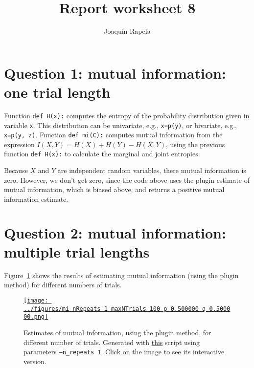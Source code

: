 \documentclass[12pt]{article}
\title{Report worksheet 8}
\author{Joaqu\'{i}n Rapela}
\begin{document}
\maketitle

\section*{Question 1: mutual information: one trial length}

Function \texttt{def H(x):} computes the entropy of the probability
distribution given in variable \texttt{x}. This distribution can be univariate,
e.g., \texttt{x=p(y)}, or bivariate, e.g., \texttt{x=p(y, z)}. Function
\texttt{def mi(C):} computes mutual information from the expression $I(X,
Y)=H(X)+H(Y)-H(X,Y)$, using the previous function \texttt{def H(x):} to
calculate the marginal and joint entropies.

Because $X$ and $Y$ are independent random variables, there mutual information
is zero. However, we don't get zero, since the code above uses the plugin
estimate of mutual information, which is biased above, and returns a positive
mutual information estimate.

\section*{Question 2: mutual information: multiple trial lengths}

Figure~\ref{fig:miEstimatesMultiTrial} shows the results of estimating mutual
information (using the plugin method) for different numbers of trials.

\begin{figure}[H]
    \begin{center}
        \href{https://www.gatsby.ucl.ac.uk/~rapela/neuroinformatics/2023/ws8/figures/mi_nRepeats_1_maxNTrials_100_p_0.500000_q_0.500000.html}{\texttt{[image: ../figures/mi\_nRepeats\_1\_maxNTrials\_100\_p\_0.500000\_q\_0.500000.png]}}

        \caption{Estimates of mutual information, using the plugin method, for different number of trials.
        Generated with
        \href{https://github.com/joacorapela/neuroinformatics23/blob/master/worksheets/ws8/mySolution/code/scripts/doEstimateMI_multiTrials.py}{this}
        script using parameters \texttt{--n\_repeats 1}. Click on the image to see its
        interactive version.}

        \label{fig:miEstimatesMultiTrial}
    \end{center}
\end{figure}
\end{document}

